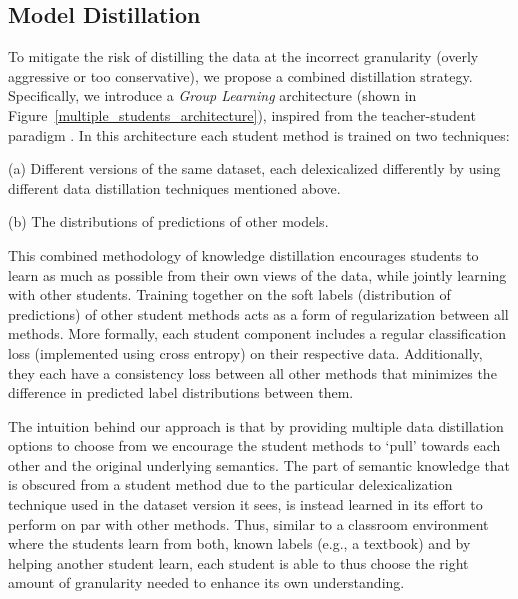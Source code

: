 \subsection{Model Distillation}

To mitigate the risk of distilling the data at the incorrect granularity (overly aggressive or too conservative), we propose a combined distillation strategy. Specifically, we introduce a \textit{Group Learning} architecture (shown in Figure~\ref{multiple_students_architecture}), inspired from the teacher-student paradigm \cite{hinton2015distilling,tarvainen2017mean,laine2016temporal,sajjadi2016regularization}. In this architecture each student method is trained on two techniques:

{\flushleft (a)} Different versions of the same dataset, each delexicalized differently by using different data distillation techniques mentioned above.

{\flushleft (b)} The distributions of predictions of other models.

This combined methodology of knowledge distillation encourages students to learn as much as possible from their own views of the data, while jointly learning with other students. Training together on the soft labels (distribution of predictions) of other student methods  acts as a form of regularization between all methods.
More formally, each student component includes a regular classification loss (implemented using cross entropy) on their respective data. Additionally, they each have a consistency loss between all other methods that minimizes the difference in predicted label distributions between them.

The intuition behind our approach is that by providing multiple data distillation options to choose from we encourage the student methods to `pull' towards each other and the original underlying semantics. The part of semantic knowledge that is obscured from a student method due to the particular delexicalization technique used in the dataset version it sees, is instead learned in its effort to perform on par with other methods.
Thus, similar to a classroom environment where the students learn from both, known labels (e.g., a textbook) and by helping another student learn, each student is able to thus choose the right amount of granularity needed to enhance its own understanding.


